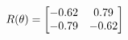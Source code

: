 \documentclass[preview]{standalone}
\begin{document}
\begin{align*}
\special{dvisvgm:raw <g id='unique000'>}R(\theta) = \begin{bmatrix}-0.62 & 0.79\\-0.79 & -0.62\end{bmatrix}\special{dvisvgm:raw </g>}
\end{align*}
\end{document}
